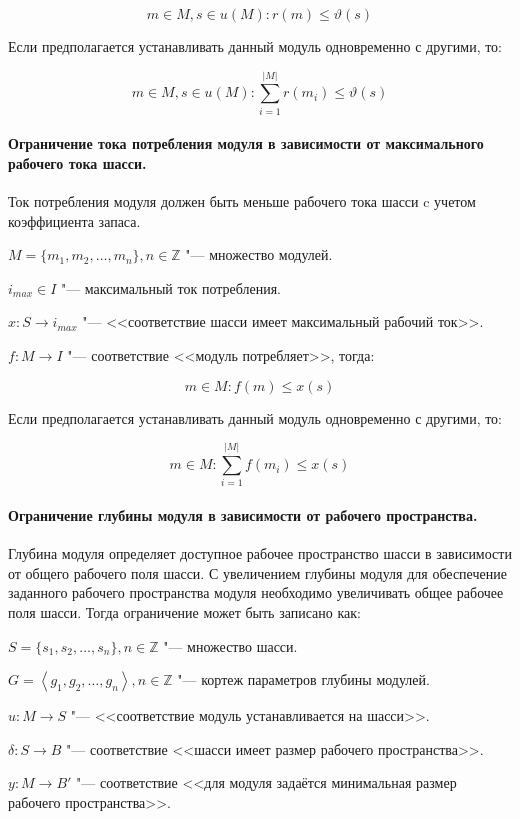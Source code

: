 \[
m \in M, s \in u(M): r(m) \leq \vartheta(s)
\]

Если предполагается устанавливать данный модуль одновременно с другими, то:

\[
m \in M, s \in u(M): \sum_{i=1}^{|M|}r(m_i) \leq \vartheta(s)
\]

\paragraph{Ограничение тока потребления модуля в зависимости от максимального рабочего тока шасси.} Ток потребления модуля должен быть меньше рабочего тока шасси c учетом коэффициента запаса.

\noindent $M = \{m_1, m_2, \ldots, m_n\}, n \in \mathbb{Z} $ "--- множество модулей.

\noindent $i_{max} \in I$ "--- максимальный ток потребления.

\noindent $x: S \rightarrow i_{max}$ "--- <<соответствие шасси имеет максимальный рабочий ток>>.

\noindent $f: M \rightarrow I$ "--- соответствие <<модуль потребляет>>, тогда:

\[
m \in M: f(m) \leq x(s)
\]

Если предполагается устанавливать данный модуль одновременно с другими, то:

\[
m \in M: \sum_{i=1}^{|M|}f(m_i) \leq x(s)
\]


\paragraph{Ограничение глубины модуля в зависимости от рабочего пространства.} Глубина модуля определяет доступное рабочее пространство шасси в зависимости от общего рабочего поля шасси. С увеличением глубины модуля для обеспечение заданного рабочего пространства модуля необходимо увеличивать общее рабочее поля шасси. Тогда ограничение может быть записано как:

\noindent $S = \{s_1, s_2, \ldots, s_n\}, n \in \mathbb{Z} $ "--- множество шасси.

\noindent $G = \left \langle g_1, g_2, \ldots, g_n\right \rangle, n \in \mathbb{Z} $ "--- кортеж параметров глубины модулей.

\noindent $u: M \rightarrow S$ "--- <<соответствие модуль устанавливается на шасси>>.

\noindent $\delta: S \rightarrow B$ "--- соответствие <<шасси имеет размер рабочего пространства>>.

\noindent $y: M \rightarrow B'$ "--- соответствие <<для модуля задаётся минимальная размер рабочего пространства>>.

